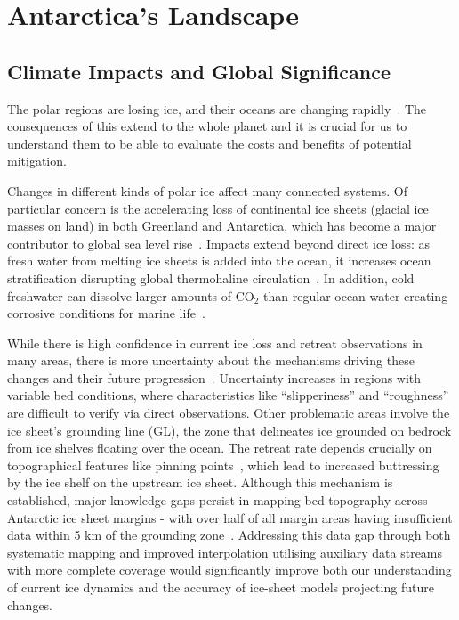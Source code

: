 \chapter{Antarctica's Landscape}\label{why}
\section{Climate Impacts and Global Significance}

The polar regions are losing ice, and their oceans are changing rapidly~\cite{O_C_in_changingClimate}. The consequences of this extend to the whole planet and it is crucial for us to understand them to be able to evaluate the costs and benefits of potential mitigation. 

Changes in different kinds of polar ice affect many connected systems. Of particular concern is the accelerating loss of continental ice sheets (glacial ice masses on land) in both Greenland and Antarctica, which has become a major contributor to global sea level rise~\cite{O_C_in_changingClimate}. Impacts extend beyond direct ice loss: as fresh water from melting ice sheets is added into the ocean, it increases ocean stratification disrupting global thermohaline circulation~\cite{Jacobs_2004}. In addition, cold freshwater can dissolve larger amounts of $\mathrm{CO_2}$ than regular ocean water creating corrosive conditions for marine life~\cite{O_C_in_changingClimate}.
 
While there is high confidence in current ice loss and retreat observations in many areas, there is more uncertainty about the mechanisms driving these changes and their future progression~\cite{Fox-Kemper_2021}. Uncertainty increases in regions with variable bed conditions, where characteristics like ``slipperiness'' and ``roughness'' are difficult to verify via direct observations. Other problematic areas involve the ice sheet's grounding line (GL), the zone that delineates ice grounded on bedrock from ice shelves floating over the ocean. The retreat rate depends crucially on topographical features like pinning points~\cite{Fox-Kemper_2021}, which lead to increased buttressing by the ice shelf on the upstream ice sheet. Although this mechanism is established, major knowledge gaps persist in mapping bed topography across Antarctic ice sheet margins - with over half of all margin areas having insufficient data within 5 km of the grounding zone~\cite{RINGS_2022}. Addressing this data gap through both systematic mapping and improved interpolation utilising auxiliary data streams with more complete coverage would significantly improve both our understanding of current ice dynamics and the accuracy of ice-sheet models projecting future changes.

